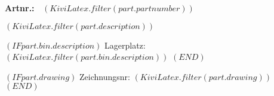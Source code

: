 \documentclass[parskip]{scrartcl}
\newcommand{\ourfont}{\setmainfont
                      [ BoldFont={cmunsx.otf},
                        ItalicFont={cmunsi.otf},
                        BoldItalicFont={cmunso.otf}
                      ]{cmunss.otf}
                      }
\begin{document}
\setlength{\parskip}{0pt} %
\setlength{\parindent}{0pt}
  \ourfont

\Huge \textbf{Artnr.:~ $(KiviLatex.filter(part.partnumber))$ }

  \large\textbf{$(KiviLatex.filter(part.description))$}
  \normalsize

  $( IF part.bin.description )$
  Lagerplatz: $(KiviLatex.filter(part.bin.description))$
  $( END )$

  $( IF part.drawing )$
  Zeichnungsnr: $(KiviLatex.filter(part.drawing))$
  $( END )$

\end{document}
